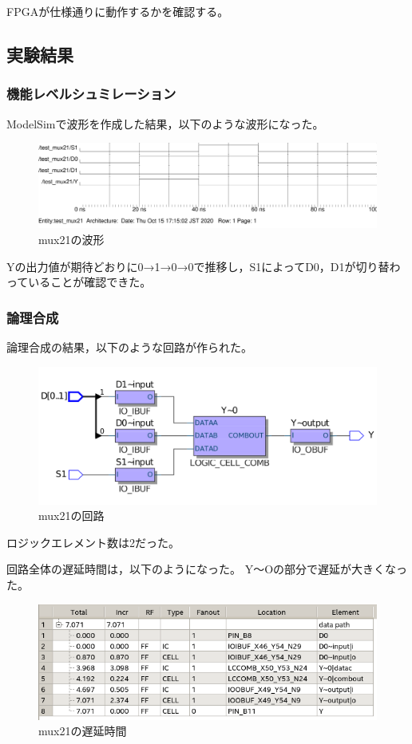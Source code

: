 FPGAが仕様通りに動作するかを確認する。

\subsection{実験結果}
\subsubsection{機能レベルシュミレーション}
ModelSimで波形を作成した結果，以下のような波形になった。

\begin{figure}[H]
  \centering
  \includegraphics[width=\linewidth]{./src/mux21/mux21_wave11.png}
  \caption{mux21の波形}
\end{figure}

Yの出力値が期待どおりに0→1→0→0で推移し，S1によってD0，D1が切り替わっていることが確認できた。

\subsubsection{論理合成}
論理合成の結果，以下のような回路が作られた。

\begin{figure}[H]
  \centering
  \includegraphics[width=\linewidth]{./src/mux21/mux21_print.png}
  \caption{mux21の回路}
\end{figure}

ロジックエレメント数は2だった。

回路全体の遅延時間は，以下のようになった。
Y～Oの部分で遅延が大きくなった。

\begin{figure}[H]
  \centering
  \includegraphics[width=\linewidth]{./src/mux21/mux21Timing.png}
  \caption{mux21の遅延時間}
\end{figure}

